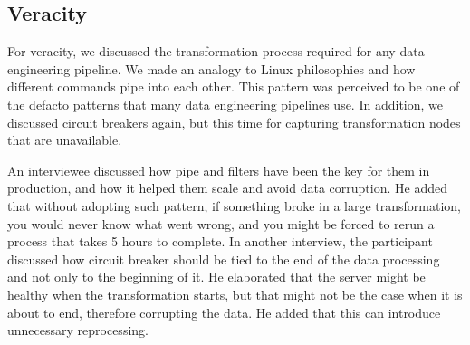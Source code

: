 \documentclass[a4paper,11pt,article,oneside]{memoir}
\begin{document}





\subsection{Veracity}

For veracity, we discussed the transformation process required for any data engineering pipeline. We made an analogy to Linux philosophies and how different commands pipe into each other. This pattern was perceived to be one of the defacto patterns that many data engineering pipelines use. In addition, we discussed circuit breakers again, but this time for capturing transformation nodes that are unavailable.


An interviewee discussed how pipe and filters have been the key for them in production, and how it helped them scale and avoid data corruption. He added that without adopting such pattern, if something broke in a large transformation, you would never know what went wrong, and you might be forced to rerun a process that takes 5 hours to complete. In another interview, the participant discussed how circuit breaker should be tied to the end of the data processing and not only to the beginning of it. He elaborated that the server might be healthy when the transformation starts, but that might not be the case when it is about to end, therefore corrupting the data. He added that this can introduce unnecessary reprocessing. 

\end{document}
